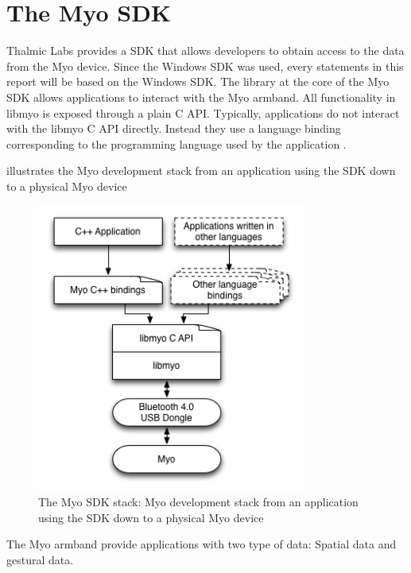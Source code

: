 \section{The Myo SDK}
\label{sec:myoSDK}
Thalmic Labs provides a SDK that allows developers to obtain access to the data from the Myo device. Since the Windows SDK was used, every statements in this report will be based on the Windows SDK. The library at the core of the Myo SDK allows applications to interact with the Myo armband. All functionality in libmyo is exposed through a plain C API. Typically, applications do not interact with the libmyo C API directly. Instead they use a language binding corresponding to the programming language used by the application \cite{myoSDK}.

 illustrates the Myo development stack from an application using the SDK down to a physical Myo device

\begin{figure}[ht]
    \centering
    \includegraphics[height=9.5cm]{images/myo-sdk-stack.png}
    \caption[The Myo SDK stack]{The Myo SDK stack: Myo development stack from an application using the SDK down to a physical Myo device}
    \label{fig:myoSDKstack}
\end{figure}

The Myo armband provide applications with two type of data: Spatial data and gestural data.

